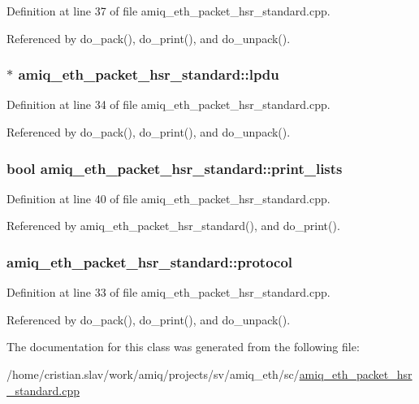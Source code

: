 Definition at line 37 of file amiq\_\-eth\_\-packet\_\-hsr\_\-standard.cpp.

Referenced by do\_\-pack(), do\_\-print(), and do\_\-unpack().\hypertarget{classamiq__eth__packet__hsr__standard_aa97b57d96337c895348c2676fac35d5d}{
\subsubsection[{lpdu}]{$\ast$ {\bf amiq\_\-eth\_\-packet\_\-hsr\_\-standard::lpdu}}}
\label{classamiq__eth__packet__hsr__standard_aa97b57d96337c895348c2676fac35d5d}


Definition at line 34 of file amiq\_\-eth\_\-packet\_\-hsr\_\-standard.cpp.

Referenced by do\_\-pack(), do\_\-print(), and do\_\-unpack().\hypertarget{classamiq__eth__packet__hsr__standard_aa666ed5570f3bb6215fd613e7dc139ae}{
\subsubsection[{print\_\-lists}]{\setlength{\rightskip}{0pt plus 5cm}bool {\bf amiq\_\-eth\_\-packet\_\-hsr\_\-standard::print\_\-lists}}}
\label{classamiq__eth__packet__hsr__standard_aa666ed5570f3bb6215fd613e7dc139ae}


Definition at line 40 of file amiq\_\-eth\_\-packet\_\-hsr\_\-standard.cpp.

Referenced by amiq\_\-eth\_\-packet\_\-hsr\_\-standard(), and do\_\-print().\hypertarget{classamiq__eth__packet__hsr__standard_ae6fe72549c1e9b93ab31ec552ff1e680}{
\subsubsection[{protocol}]{ {\bf amiq\_\-eth\_\-packet\_\-hsr\_\-standard::protocol}}}
\label{classamiq__eth__packet__hsr__standard_ae6fe72549c1e9b93ab31ec552ff1e680}


Definition at line 33 of file amiq\_\-eth\_\-packet\_\-hsr\_\-standard.cpp.

Referenced by do\_\-pack(), do\_\-print(), and do\_\-unpack().

The documentation for this class was generated from the following file:\begin{DoxyCompactItemize}
\item 
/home/cristian.slav/work/amiq/projects/sv/amiq\_\-eth/sc/\hyperlink{amiq__eth__packet__hsr__standard_8cpp}{amiq\_\-eth\_\-packet\_\-hsr\_\-standard.cpp}\end{DoxyCompactItemize}
